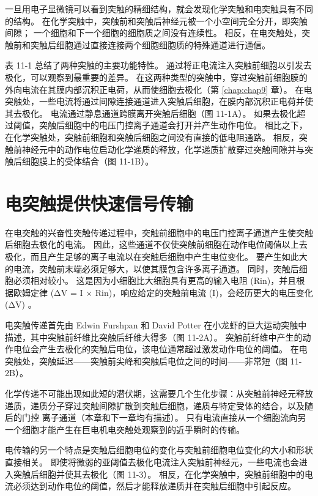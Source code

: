 一旦用电子显微镜可以看到突触的精细结构，就会发现化学突触和电突触具有不同的结构。 
在化学突触中，突触前和突触后神经元被一个小空间完全分开，即突触间隙； 
一个细胞和下一个细胞的细胞质之间没有连续性。 
相反，在电突触处，突触前和突触后细胞通过直接连接两个细胞细胞质的特殊通道进行通信。


表 11-1 总结了两种突触的主要功能特性。 
通过将正电流注入突触前细胞以引发去极化，可以观察到最重要的差异。 
在这两种类型的突触中，穿过突触前细胞膜的外向电流在其膜内部沉积正电荷，从而使细胞去极化（第 \ref{chap:chap9} 章）。 
在电突触处，一些电流将通过间隙连接通道进入突触后细胞，在膜内部沉积正电荷并使其去极化。 
电流通过静息通道跨膜离开突触后细胞（图 11-1A）。 如果去极化超过阈值，突触后细胞中的电压门控离子通道会打开并产生动作电位。 
相比之下，在化学突触处，突触前细胞和突触后细胞之间没有直接的低电阻通路。 
相反，突触前神经元中的动作电位启动化学递质的释放，化学递质扩散穿过突触间隙并与突触后细胞膜上的受体结合（图 11-1B）。


\section{电突触提供快速信号传输}
在电突触的兴奋性突触传递过程中，突触前细胞中的电压门控离子通道产生使突触后细胞去极化的电流。 
因此，这些通道不仅使突触前细胞在动作电位阈值以上去极化，而且产生足够的离子电流以在突触后细胞中产生电位变化。 
要产生如此大的电流，突触前末端必须足够大，以使其膜包含许多离子通道。 
同时，突触后细胞必须相对较小。 
这是因为小细胞比大细胞具有更高的输入电阻 (Rin)，并且根据欧姆定律 (ΔV = I × Rin)，响应给定的突触前电流 (I)，会经历更大的电压变化 (ΔV) 。


电突触传递首先由 Edwin Furshpan 和 David Potter 在小龙虾的巨大运动突触中描述，其中突触前纤维比突触后纤维大得多（图 11-2A）。 
突触前纤维中产生的动作电位会产生去极化的突触后电位，该电位通常超过激发动作电位的阈值。 
在电突触处，突触延迟——突触前尖峰和突触后电位之间的时间——非常短（图 11-2B）。


化学传递不可能出现如此短的潜伏期，这需要几个生化步骤：从突触前神经元释放递质，递质分子穿过突触间隙扩散到突触后细胞，递质与特定受体的结合，以及随后的门控 离子通道（本章和下一章均有描述）。 
只有电流直接从一个细胞流向另一个细胞才能产生在巨电机电突触处观察到的近乎瞬时的传输。


电传输的另一个特点是突触后细胞电位的变化与突触前细胞电位变化的大小和形状直接相关。 
即使将微弱的亚阈值去极化电流注入突触前神经元，一些电流也会进入突触后细胞并使其去极化（图 11-3）。 
相反，在化学突触中，突触前细胞中的电流必须达到动作电位的阈值，然后才能释放递质并在突触后细胞中引起反应。


